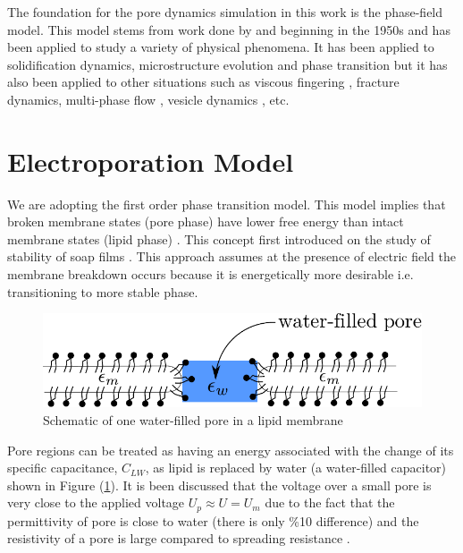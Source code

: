\documentclass[english,12pt]{article}
\begin{document}
The foundation for the pore dynamics simulation in this work is the phase-field model. This model stems from work done by \citep{landau1950theory,Cahn1971151} and \citep{Allen19791085} beginning in the 1950s and has been applied to study a variety of physical phenomena. It has been applied to solidification dynamics, microstructure evolution and phase transition but it has also been applied to other situations such as viscous fingering \citep{PhysRevE.61.6632,PhysRevE.68.046310}, fracture dynamics,\cite{PhysRevLett.87.045501} multi-phase flow \cite{Steinbach1996135,Badalassi2003371}, vesicle dynamics \cite{Du2004450,PhysRevE.79.031926}, etc.


\section{Electroporation Model}

We are adopting the first order phase transition model. This model implies that broken membrane states (pore phase) have lower free energy than intact membrane states (lipid phase) . This concept first introduced on the study of stability of soap films \cite{deryagin1962theory}. This approach assumes at the presence of electric field the membrane breakdown occurs because it is energetically more desirable i.e. transitioning to more stable phase.
\begin{figure}[H]
	\centering
	\includegraphics[scale=0.8]{pics/pore1.pdf}
	\caption{Schematic of one water-filled pore in a lipid membrane}
	\label{fig:pore1}
\end{figure}
Pore regions can be treated as having an energy associated with the change of its specific capacitance, $C_{LW}$, as lipid is replaced by water (a water-filled capacitor) shown in Figure (\ref{fig:pore1}). It is been discussed that the voltage over a small pore is very close to the applied voltage $U_{p}\approx U=U_m$ due to the fact that the permittivity of pore is close to water (there is only \%10 difference) and the resistivity of a pore is large compared to spreading resistance \cite{Weaver1996135}. 
\end{document}
